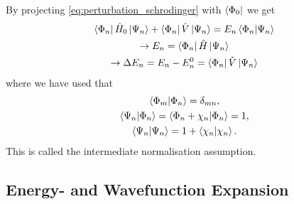 By projecting \autoref{eq:perturbation_schrodinger} with $\bra{\Phi_0}$ we get
\begin{equation}
    \begin{gathered}
    \bra{\Phi_n} \hat{H}_0 \ket{\Psi_n} + \bra{\Phi_n} \hat{V} \ket{\Psi_n}
        = E_n \braket{\Phi_n}{\Psi_n} \\
    \to E_n = \bra{\Phi_n} \hat{H} \ket{\Psi_n} \\
    \to \Delta E_n = E_n - E_n^{0} = \bra{\Phi_n} \hat{V} \ket{\Psi_n}
    \end{gathered}
\end{equation}
where we have used that 
\begin{gather}
    \label{eq:intermediate_normalisation}
    \braket{\Phi_m}{\Phi_n} = \delta_{mn}, \\
    \braket{\Psi_n}{\Phi_n} = \braket{\Phi_n + \chi_n}{\Phi_n} = 1, \\
    \braket{\Psi_n} = 1 + \braket{\chi_n}.
\end{gather}
This is called the intermediate normalisation assumption.

\subsection{Energy- and Wavefunction Expansion}

